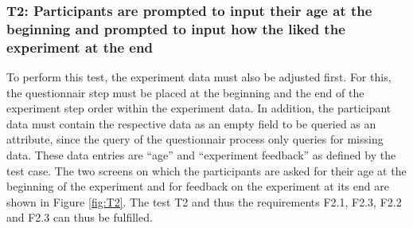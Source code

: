 \newpage\subsubsection*{T2: Participants are prompted to input their age at the beginning and prompted to input how the liked the experiment at the end}

To perform this test, the experiment data must also be adjusted first. For this, the questionnair step must be placed at the beginning and the end of the experiment step order within the experiment data. In addition, the participant data must contain the respective data as an empty field to be queried as an attribute, since the query of the questionnair process only queries for missing data. These data entries are \enquote{age} and \enquote{experiment feedback} as defined by the test case. The two screens on which the participants are asked for their age at the beginning of the experiment and for feedback on the experiment at its end are shown in Figure \ref{fig:T2}. The test T2 and thus the requirements F2.1, F2.3, F2.2 and F2.3 can thus be fulfilled.

\vspace{0.5cm}

